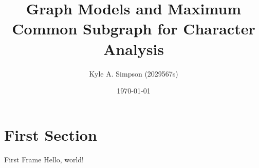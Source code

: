 \documentclass{beamer}
\title{Graph Models and Maximum Common Subgraph for Character Analysis}
\date{\today}
\author{Kyle A. Simpson (2029567s)}
\institute{University of Glasgow}
\begin{document}
	  \maketitle
	  \section{First Section}
	  \begin{frame}{First Frame}
		    Hello, world!
	  \end{frame}
\end{document}
